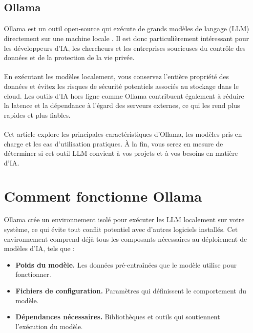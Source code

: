 \subsection{Ollama  }

\paragraph{}
Ollama est un outil open-source qui exécute de grands modèles de langage (LLM) directement sur une machine locale . Il est donc particulièrement intéressant pour les développeurs d’IA, les chercheurs et les entreprises soucieuses du contrôle des données et de la protection de la vie privée.
\paragraph{}
En exécutant les modèles localement, vous conservez l’entière propriété des données et évitez les risques de sécurité potentiels associés au stockage dans le cloud. Les outils d’IA hors ligne comme Ollama contribuent également à réduire la latence et la dépendance à l’égard des serveurs externes, ce qui les rend plus rapides et plus fiables.
\paragraph{}
Cet article explore les principales caractéristiques d’Ollama, les modèles pris en charge et les cas d’utilisation pratiques. À la fin, vous serez en mesure de déterminer si cet outil LLM convient à vos projets et à vos besoins en matière d’IA.

\section*{Comment fonctionne Ollama}

Ollama crée un environnement isolé pour exécuter les LLM localement sur votre système, ce qui évite tout conflit potentiel avec d’autres logiciels installés. Cet environnement comprend déjà tous les composants nécessaires au déploiement de modèles d’IA, tels que :

\begin{itemize}
    \item \textbf{Poids du modèle.} Les données pré-entraînées que le modèle utilise pour fonctionner.
    \item \textbf{Fichiers de configuration.} Paramètres qui définissent le comportement du modèle.
    \item \textbf{Dépendances nécessaires.} Bibliothèques et outils qui soutiennent l’exécution du modèle.
\end{itemize}

